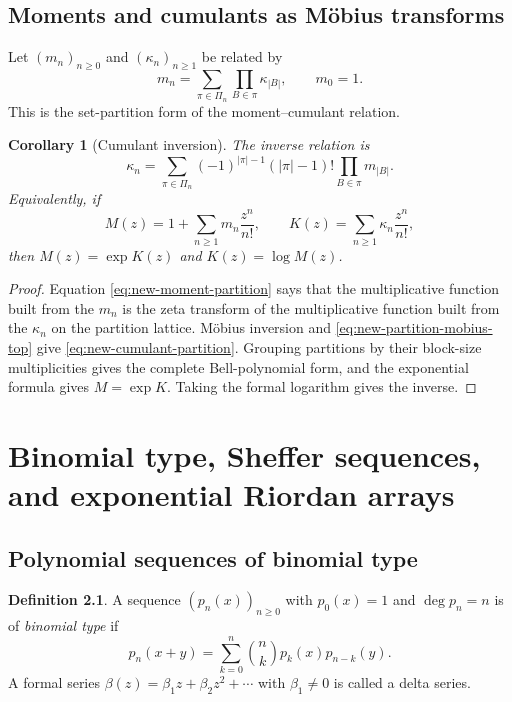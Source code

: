 \documentclass[11pt,a4paper,oneside,openany]{book}
\newtheorem{corollary}[theorem]{Corollary}
\theoremstyle{definition}
\newtheorem{definition}[theorem]{Definition}
\theoremstyle{remark}
\begin{document}
\section{Moments and cumulants as Möbius transforms}

Let $(m_n)_{n\ge0}$ and $(\kappa_n)_{n\ge1}$ be related by
\begin{equation}\label{eq:new-moment-partition}
 m_n=\sum_{\pi\in\Pi_n}\prod_{B\in\pi}\kappa_{|B|},
 \qquad m_0=1.
\end{equation}
This is the set-partition form of the moment--cumulant relation.

\begin{corollary}[Cumulant inversion]\label{cor:new-cumulant-inversion}
The inverse relation is
\begin{equation}\label{eq:new-cumulant-partition}
 \kappa_n=\sum_{\pi\in\Pi_n}
 (-1)^{|\pi|-1}(|\pi|-1)!
 \prod_{B\in\pi}m_{|B|}.
\end{equation}
Equivalently, if
\[
 M(z)=1+\sum_{n\ge1}m_n\frac{z^n}{n!},\qquad
 K(z)=\sum_{n\ge1}\kappa_n\frac{z^n}{n!},
\]
then $M(z)=\exp K(z)$ and $K(z)=\log M(z)$.
\end{corollary}

\begin{proof}
Equation \eqref{eq:new-moment-partition} says that the multiplicative function
built from the $m_n$ is the zeta transform of the multiplicative function built
from the $\kappa_n$ on the partition lattice.  Möbius inversion and
\eqref{eq:new-partition-mobius-top} give
\eqref{eq:new-cumulant-partition}.  Grouping partitions by their block-size
multiplicities gives the complete Bell-polynomial form, and the exponential
formula gives $M=\exp K$.  Taking the formal logarithm gives the inverse.
\end{proof}

\chapter{Binomial type, Sheffer sequences, and exponential Riordan arrays}
\label{ch:sheffer-riordan}

\section{Polynomial sequences of binomial type}

\begin{definition}
A sequence $(p_n(x))_{n\ge0}$ with $p_0(x)=1$ and $\deg p_n=n$ is of
\emph{binomial type} if
\begin{equation}\label{eq:new-binomial-type}
 p_n(x+y)=\sum_{k=0}^n\binom nk p_k(x)p_{n-k}(y).
\end{equation}
A formal series $\beta(z)=\beta_1z+\beta_2z^2+\cdots$ with
$\beta_1\ne0$ is called a delta series.
\end{definition}
\end{document}
